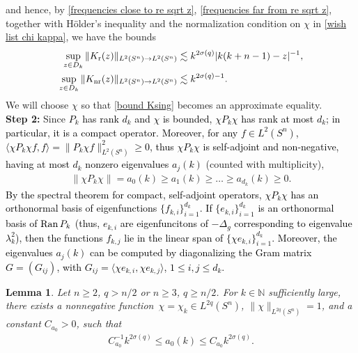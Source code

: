 \documentclass[12pt]{amsart}
\newcommand{\Ran}{\mathop{\rm Ran}}
\newcommand{\N}{{\mathbb N}}
\newcommand\jc[1]{\textcolor{black}{#1}}
\newtheorem{lemma}[theorem]{Lemma}
\begin{document}
and hence, by \eqref{frequencies close to re sqrt z}, \eqref{frequencies far from re sqrt z}, together with H\"older's inequality and the normalization condition on $\chi$ in \eqref{wish list chi kappa}, we have the bounds
\begin{align}
\sup_{z\in D_k}\|K_{\rm r}(z)\|_{L^{2}(S^n)\to L^{2}(S^n)}&\lesssim k^{2\sigma(q)}|k(k+n-1)-z|^{-1},\label{bound Ksing}\\
\sup_{z\in D_k}\|K_{\rm nr}(z)\|_{L^{2}(S^n)\to L^{2}(S^n)}&\lesssim k^{2\sigma(q)-1}.\label{bound Kreg}
\end{align}
We will choose $\chi$ so that \eqref{bound Ksing} becomes an approximate equality. \\

\textbf{Step 2:} Since \jc{$P_k$ has rank $d_k$ and $\chi$ is bounded, $\chi P_k\chi$ has rank at most $d_k$; in particular, it is a compact operator. Moreover, for any $f\in L^2(S^n)$, $\langle \chi P_k\chi f,f\rangle=\|P_k\chi f\|^2_{L^2(S^n)}\geq 0$, thus $\chi P_k\chi$ is self-adjoint and non-negative,
having at most $d_k$ nonzero eigenvalues $a_j(k)$} (counted with multiplicity),
\begin{align}\label{list of aj(k)}
    \|\chi P_k\chi\|=a_0(k)\geq a_1(k) \geq \ldots \geq a_{d_k}(k)\geq 0.
\end{align}
\jc{By the spectral theorem for compact, self-adjoint operators, $\chi P_k\chi$ has an orthonormal basis of eigenfunctions $\{f_{k,i}\}_{i=1}^{d_k}$. If $\{e_{k,i}\}_{i=1}^{d_k}$ is an orthonormal basis of $\Ran P_k$ (thus, $e_{k,i}$ are eigenfuncitons of $-\Delta_g$ corresponding to eigenvalue $\lambda_k^2$), then the functions $f_{k,j}$ lie in the linear span of $\{\chi e_{k,i}\}_{i=1}^{d_k}$. Moreover, the eigenvalues $a_j(k)$ can be computed by diagonalizing the Gram matrix $G=(G_{ij})$, with $G_{ij}=\langle\chi e_{k,i},\chi e_{k,j}\rangle$, $1\leq i,j\leq d_k$.}

\begin{lemma}\label{lemma chi P_k chi}
Let $n\geq 2$, $q>n/2$ or $n\geq 3$, $q\geq n/2$. For $k\in\N$ sufficiently large, there exists a nonnegative function~$\chi=\chi_k\in L^{2q}(S^n)$, $\|\chi\|_{L^{2q}(S^n)}=1$, and a constant $C_{a_0}>0$, such that 
 \begin{align}\label{chi saturates cluster bound sphere}
    C_{a_0}^{-1}k^{2\sigma(q)}\leq a_0(k)\leq C_{a_0}k^{2\sigma(q)}.
\end{align}
\end{lemma}
\end{document}
